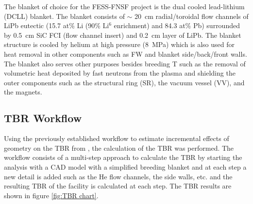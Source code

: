 \documentclass[12pt, letterpaper]{elsarticle}
\begin{document}
The blanket of choice for the FESS-FNSF project is the dual cooled lead-lithium (DCLL) \cite{ref_12} blanket. The blanket consists of $\sim$ \SI{20}{cm} radial/toroidal flow channels of LiPb eutectic (15.7 at\% Li (90\% Li$^6$ enrichment) and 84.3 at\% Pb) surrounded by \SI{0.5}{cm} SiC FCI (flow channel insert) and \SI{0.2}{cm} layer of LiPb. The blanket structure is cooled by helium at high pressure (\SI{8}{MPa}) which is also used for heat removal in other components such as FW and blanket side/back/front walls. The blanket also serves other purposes besides breeding T such as the removal of volumetric heat deposited by fast neutrons from the plasma and shielding the outer components such as the structural ring (SR), the vacuum vessel (VV), and the magnets.

\subsection{TBR Workflow} \label{TBR Workflow}
Using the previously established workflow to estimate incremental effects of
geometry on the TBR from \cite{ref_13}, the calculation
of the TBR was performed. The workflow
consists of a multi-step approach to calculate the TBR by starting the analysis
with a CAD model with a simplified breeding blanket and at each step a new
detail is added such as the He flow channels, the side walls, etc. and the
resulting TBR of the facility is calculated at each step. The TBR results are
shown in figure \ref{fig:TBR chart}. \vspace{5mm}
\end{document}
